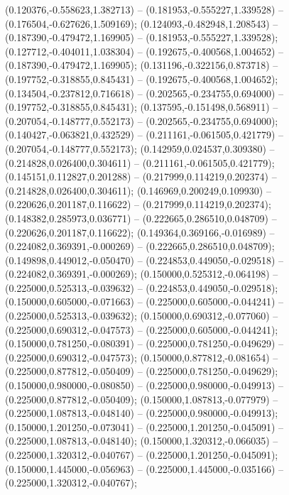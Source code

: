  (0.120376,-0.558623,1.382713) -- (0.181953,-0.555227,1.339528) -- (0.176504,-0.627626,1.509169);
 (0.124093,-0.482948,1.208543) -- (0.187390,-0.479472,1.169905) -- (0.181953,-0.555227,1.339528);
 (0.127712,-0.404011,1.038304) -- (0.192675,-0.400568,1.004652) -- (0.187390,-0.479472,1.169905);
 (0.131196,-0.322156,0.873718) -- (0.197752,-0.318855,0.845431) -- (0.192675,-0.400568,1.004652);
 (0.134504,-0.237812,0.716618) -- (0.202565,-0.234755,0.694000) -- (0.197752,-0.318855,0.845431);
 (0.137595,-0.151498,0.568911) -- (0.207054,-0.148777,0.552173) -- (0.202565,-0.234755,0.694000);
 (0.140427,-0.063821,0.432529) -- (0.211161,-0.061505,0.421779) -- (0.207054,-0.148777,0.552173);
 (0.142959,0.024537,0.309380) -- (0.214828,0.026400,0.304611) -- (0.211161,-0.061505,0.421779);
 (0.145151,0.112827,0.201288) -- (0.217999,0.114219,0.202374) -- (0.214828,0.026400,0.304611);
 (0.146969,0.200249,0.109930) -- (0.220626,0.201187,0.116622) -- (0.217999,0.114219,0.202374);
 (0.148382,0.285973,0.036771) -- (0.222665,0.286510,0.048709) -- (0.220626,0.201187,0.116622);
 (0.149364,0.369166,-0.016989) -- (0.224082,0.369391,-0.000269) -- (0.222665,0.286510,0.048709);
 (0.149898,0.449012,-0.050470) -- (0.224853,0.449050,-0.029518) -- (0.224082,0.369391,-0.000269);
 (0.150000,0.525312,-0.064198) -- (0.225000,0.525313,-0.039632) -- (0.224853,0.449050,-0.029518);
 (0.150000,0.605000,-0.071663) -- (0.225000,0.605000,-0.044241) -- (0.225000,0.525313,-0.039632);
 (0.150000,0.690312,-0.077060) -- (0.225000,0.690312,-0.047573) -- (0.225000,0.605000,-0.044241);
 (0.150000,0.781250,-0.080391) -- (0.225000,0.781250,-0.049629) -- (0.225000,0.690312,-0.047573);
 (0.150000,0.877812,-0.081654) -- (0.225000,0.877812,-0.050409) -- (0.225000,0.781250,-0.049629);
 (0.150000,0.980000,-0.080850) -- (0.225000,0.980000,-0.049913) -- (0.225000,0.877812,-0.050409);
 (0.150000,1.087813,-0.077979) -- (0.225000,1.087813,-0.048140) -- (0.225000,0.980000,-0.049913);
 (0.150000,1.201250,-0.073041) -- (0.225000,1.201250,-0.045091) -- (0.225000,1.087813,-0.048140);
 (0.150000,1.320312,-0.066035) -- (0.225000,1.320312,-0.040767) -- (0.225000,1.201250,-0.045091);
 (0.150000,1.445000,-0.056963) -- (0.225000,1.445000,-0.035166) -- (0.225000,1.320312,-0.040767);
